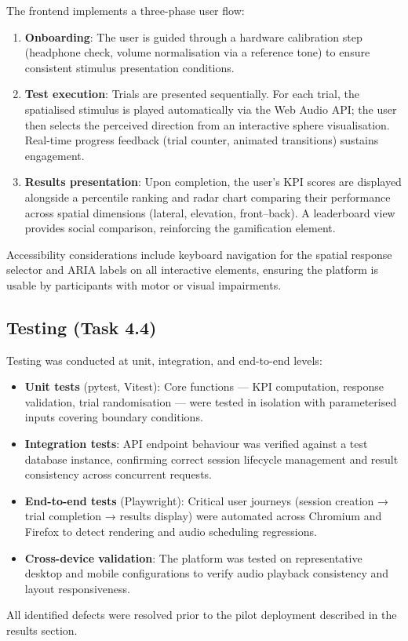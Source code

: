 The frontend implements a three-phase user flow:

\begin{enumerate}
    \item \textbf{Onboarding}: The user is guided through a hardware calibration step
    (headphone check, volume normalisation via a reference tone) to ensure consistent
    stimulus presentation conditions.
    \item \textbf{Test execution}: Trials are presented sequentially. For each trial,
    the spatialised stimulus is played automatically via the Web Audio API; the user
    then selects the perceived direction from an interactive sphere visualisation.
    Real-time progress feedback (trial counter, animated transitions) sustains engagement.
    \item \textbf{Results presentation}: Upon completion, the user's KPI scores are
    displayed alongside a percentile ranking and radar chart comparing their performance
    across spatial dimensions (lateral, elevation, front–back). A leaderboard view
    provides social comparison, reinforcing the gamification element.
\end{enumerate}

Accessibility considerations include keyboard navigation for the spatial response
selector and ARIA labels on all interactive elements, ensuring the platform is usable
by participants with motor or visual impairments.

\subsection{Testing (Task 4.4)}

Testing was conducted at unit, integration, and end-to-end levels:

\begin{itemize}
    \item \textbf{Unit tests} (pytest, Vitest): Core functions — KPI computation,
    response validation, trial randomisation — were tested in isolation with
    parameterised inputs covering boundary conditions.
    \item \textbf{Integration tests}: API endpoint behaviour was verified against a
    test database instance, confirming correct session lifecycle management and
    result consistency across concurrent requests.
    \item \textbf{End-to-end tests} (Playwright): Critical user journeys (session
    creation → trial completion → results display) were automated across Chromium
    and Firefox to detect rendering and audio scheduling regressions.
    \item \textbf{Cross-device validation}: The platform was tested on representative
    desktop and mobile configurations to verify audio playback consistency and layout
    responsiveness.
\end{itemize}

All identified defects were resolved prior to the pilot deployment described in the
results section.
